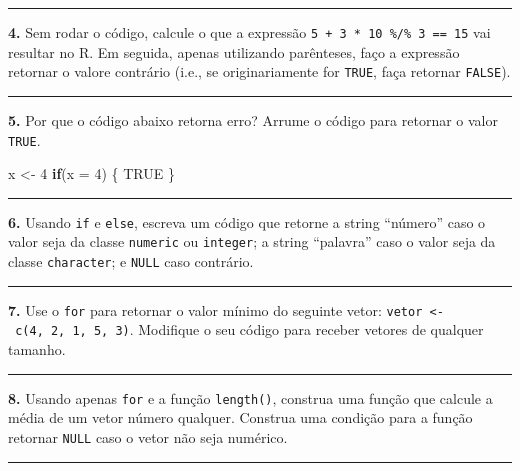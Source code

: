 \documentclass[
]{book}
\newenvironment{Shaded}{\begin{snugshade}}{\end{snugshade}}
\newcommand{\ControlFlowTok}[1]{\textcolor[rgb]{0.13,0.29,0.53}{\textbf{#1}}}
\newcommand{\DataTypeTok}[1]{\textcolor[rgb]{0.13,0.29,0.53}{#1}}
\newcommand{\DecValTok}[1]{\textcolor[rgb]{0.00,0.00,0.81}{#1}}
\newcommand{\NormalTok}[1]{#1}
\newcommand{\OtherTok}[1]{\textcolor[rgb]{0.56,0.35,0.01}{#1}}
\newcommand{\StringTok}[1]{\textcolor[rgb]{0.31,0.60,0.02}{#1}}
\begin{document}
\begin{center}\rule{0.5\linewidth}{0.5pt}\end{center}

\textbf{4.} Sem rodar o código, calcule o que a expressão \texttt{5\ +\ 3\ *\ 10\ \%/\%\ 3\ ==\ 15} vai resultar no R. Em seguida, apenas utilizando parênteses, faço a expressão retornar o valore contrário (i.e., se originariamente for \texttt{TRUE}, faça retornar \texttt{FALSE}).

\begin{center}\rule{0.5\linewidth}{0.5pt}\end{center}

\textbf{5.} Por que o código abaixo retorna erro? Arrume o código para retornar o valor \texttt{TRUE}.

\begin{Shaded}
\begin{Highlighting}[]
\NormalTok{x <{-}}\StringTok{ }\DecValTok{4}
\ControlFlowTok{if}\NormalTok{(}\DataTypeTok{x =} \DecValTok{4}\NormalTok{) \{}
  \OtherTok{TRUE}
\NormalTok{\}}
\end{Highlighting}
\end{Shaded}

\begin{center}\rule{0.5\linewidth}{0.5pt}\end{center}

\textbf{6.} Usando \texttt{if} e \texttt{else}, escreva um código que retorne a string ``número'' caso o valor seja da classe \texttt{numeric} ou \texttt{integer}; a string ``palavra'' caso o valor seja da classe \texttt{character}; e \texttt{NULL} caso contrário.

\begin{center}\rule{0.5\linewidth}{0.5pt}\end{center}

\textbf{7.} Use o \texttt{for} para retornar o valor mínimo do seguinte vetor: \texttt{vetor\ \textless{}-\ c(4,\ 2,\ 1,\ 5,\ 3)}. Modifique o seu código para receber vetores de qualquer tamanho.

\begin{center}\rule{0.5\linewidth}{0.5pt}\end{center}

\textbf{8.} Usando apenas \texttt{for} e a função \texttt{length()}, construa uma função que calcule a média de um vetor número qualquer. Construa uma condição para a função retornar \texttt{NULL} caso o vetor não seja numérico.

\begin{center}\rule{0.5\linewidth}{0.5pt}\end{center}
\end{document}
